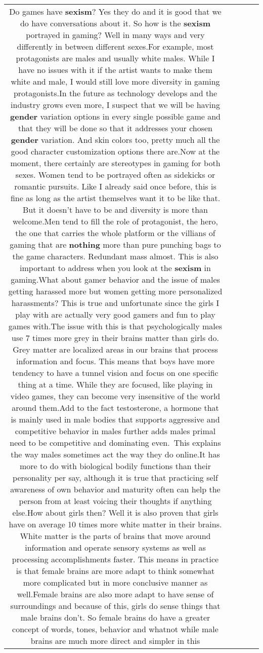 \documentclass[11pt]{article}
\newlength\mylength
\begin{document}
\begin{center}
\begin{longtable}{|C{.65\mylength}|C{.30\mylength}|C{.12\mylength}|C{.12\mylength}|C{.12\mylength}|}
  \small Do games have \textbf{sexism}? Yes they do and it is good that we do have conversations about it. So how is the \textbf{sexism} portrayed in gaming? Well in many ways and very differently in between different sexes.For example, most protagonists are males and usually white males. While I have no issues with it if the artist wants to make them white and male, I would still love more diversity in gaming protagonists.In the future as technology develops and the industry grows even more, I suspect that we will be having \textbf{gender} variation options in every single possible game and that they will be done so that it addresses your chosen \textbf{gender} variation. And skin colors too, pretty much all the good character customization options there are.Now at the moment, there certainly are stereotypes in gaming for both sexes. Women tend to be portrayed often as sidekicks or romantic pursuits. Like I already said once before, this is fine as long as the artist themselves want it to be like that. But it doesn't have to be and diversity is more than welcome.Men tend to fill the role of protagonist, the hero, the one that carries the whole platform or the villians of gaming that are \textbf{nothing} more than pure punching bags to the game characters. Redundant mass almost. This is also important to address when you look at the \textbf{sexism} in gaming.What about gamer behavior and the issue of males getting harassed more but women getting more personalized harassments? This is true and unfortunate since the girls I play with are actually very good gamers and fun to play games with.The issue with this is that psychologically males use 7 times more grey in their brains matter than girls do. Grey matter are localized areas in our brains that process information and focus. This means that boys have more tendency to have a tunnel vision and focus on one specific thing at a time. While they are focused, like playing in video games, they can become very insensitive of the world around them.Add to the fact testosterone, a hormone that is mainly used in male bodies that supports aggressive and competitive behavior in males further adds males primal need to be competitive and dominating even. This explains the way males sometimes act the way they do online.It has more to do with biological bodily functions than their personality per say, although it is true that practicing self awareness of own behavior and maturity often can help the person from at least voicing their thoughts if anything else.How about girls then? Well it is also proven that girls have on average 10 times more white matter in their brains. White matter is the parts of brains that move around information and operate sensory systems as well as processing accomplishments faster. This means in practice is that female brains are more adapt to think somewhat more complicated but in more conclusive manner as well.Female brains are also more adapt to have sense of surroundings and because of this, girls do sense things that male brains don't. So female brains do have a greater concept of words, tones, behavior and whatnot while male brains are much more direct and simpler in this 
\end{longtable}
\end{center}
\end{document}
